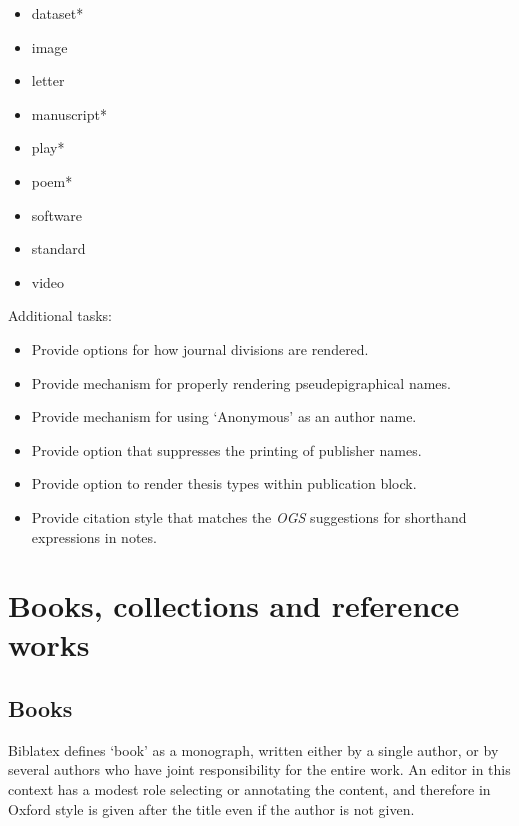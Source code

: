 \documentclass[extrafontsizes,11pt,a4paper,oneside]{memoir}
\newcommand*{\code}[1]{`\textsf{#1}'}
\begin{document}
\begin{multicols}{2}
  \begin{itemize}\firmlist
    \item dataset*
    \item image
    \item letter
    \item manuscript*
    \item play*
    \item poem*
    \item software
    \item standard
    \item video
  \end{itemize}
\end{multicols}

Additional tasks:

\begin{itemize}
  \item Provide options for how journal divisions are rendered.
  \item Provide mechanism for properly rendering pseudepigraphical names.
  \item Provide mechanism for using ‘Anonymous’ as an author name.
  \item Provide option that suppresses the printing of publisher names.
  \item Provide option to render thesis types within publication block.
  \item Provide citation style that matches the \emph{OGS} suggestions for shorthand expressions in notes.
\end{itemize}

\chapter{Books, collections and reference works}\label{sec:book}

\section{Books}

Biblatex defines \code{book} as a monograph, written either by a single author, or by several authors who have joint responsibility for the entire work. An editor in this context has a modest role selecting or annotating the content, and therefore in Oxford style is given after the title even if the author is not given.
\end{document}
